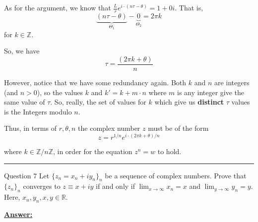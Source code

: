 \documentclass{article}
\newcommand{\R}{\mathbb{R}}
\begin{document}
\vskip 1cm
As for the argument, we know that $ \frac{L}{r} e^{i \cdot \left( n\tau - \theta \right)} = 1 + 0i$. That is, 
\[ \underbrace{(n\tau - \theta)}_{\Theta_1} - \underbrace{0}_{\Theta_2} = 2\pi k \] 
for $k \in \mathbb{Z}$.

\vskip 0.5cm
So, we have 
\[ \boxed{\tau = \frac{\left(2\pi k + \theta\right)}{n} } \]

\vskip 0.5cm
However, notice that we have some redundancy again. Both $k$ and $n$ are integers (and $n > 0$), so the values $k$ and $k' = k + m \cdot n$ where $m$ is any integer give the same value of $\tau$. So, really, the set of values for $k$ which give us \textbf{distinct} $\tau$ values is the Integers modulo $n$.


\vskip 0.5cm
Thus, in terms of $r, \theta, n$ the complex number $z$ must be of the form 
\[ \boxed{z = r^{1/n} e^{i \cdot \left(2\pi k + \theta\right)/n}} \]

where $k \in \mathbb{Z}/n\mathbb{Z}$, in order for the equation $z^n = w$ to hold.

\vskip 0.5cm
\hrule 
\vskip 0.5cm

\begin{mathdefinitionbox}{Question 7}
\vskip 0.5cm
Let $\{z_n = x_n + i y_n\}_n$ be a sequence of complex numbers. Prove that $\{z_n\}_n$ converges to $z \equiv x + iy$ if and only if $\lim_{x \rightarrow \infty} x_n = x$ and $\lim_{y \rightarrow \infty} y_n = y$. Here, $x_n, y_n, x, y \in \R$.
\end{mathdefinitionbox}
  
\vskip 0.5cm
\underline{\textbf{Answer:}} 
\vskip 0.5cm
\end{document}
